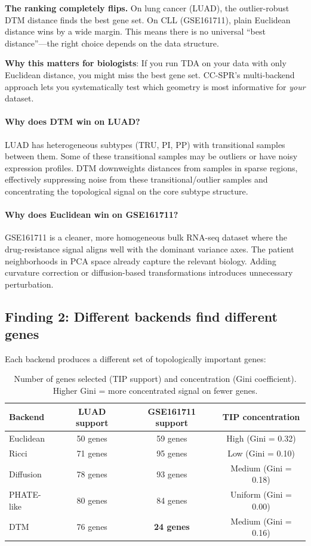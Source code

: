 \documentclass[11pt]{article}
\begin{document}
\begin{takeaway}
\textbf{The ranking completely flips.} On lung cancer (LUAD), the outlier-robust DTM distance finds the best gene set. On CLL (GSE161711), plain Euclidean distance wins by a wide margin. This means there is no universal ``best distance''---the right choice depends on the data structure.

\textbf{Why this matters for biologists}: If you run TDA on your data with only Euclidean distance, you might miss the best gene set. CC-SPR's multi-backend approach lets you systematically test which geometry is most informative for \emph{your} dataset.
\end{takeaway}

\paragraph{Why does DTM win on LUAD?}
LUAD has heterogeneous subtypes (TRU, PI, PP) with transitional samples between them. Some of these transitional samples may be outliers or have noisy expression profiles. DTM downweights distances from samples in sparse regions, effectively suppressing noise from these transitional/outlier samples and concentrating the topological signal on the core subtype structure.

\paragraph{Why does Euclidean win on GSE161711?}
GSE161711 is a cleaner, more homogeneous bulk RNA-seq dataset where the drug-resistance signal aligns well with the dominant variance axes. The patient neighborhoods in PCA space already capture the relevant biology. Adding curvature correction or diffusion-based transformations introduces unnecessary perturbation.

\subsection{Finding 2: Different backends find different genes}

Each backend produces a different set of topologically important genes:

\begin{table}[h]
\centering
\begin{tabular}{lccc}
\toprule
\textbf{Backend} & \textbf{LUAD support} & \textbf{GSE161711 support} & \textbf{TIP concentration} \\
\midrule
Euclidean & 50 genes & 59 genes & High (Gini = 0.32) \\
Ricci & 71 genes & 95 genes & Low (Gini = 0.10) \\
Diffusion & 78 genes & 93 genes & Medium (Gini = 0.18) \\
PHATE-like & 80 genes & 84 genes & Uniform (Gini = 0.00) \\
DTM & 76 genes & \textbf{24 genes} & Medium (Gini = 0.16) \\
\bottomrule
\end{tabular}
\caption{Number of genes selected (TIP support) and concentration (Gini coefficient). Higher Gini = more concentrated signal on fewer genes.}
\end{table}
\end{document}
